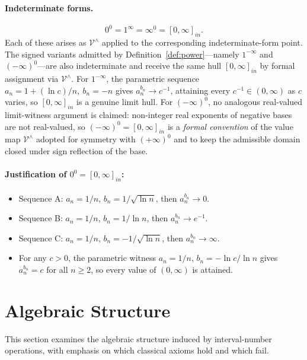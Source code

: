 \documentclass[11pt,a4paper]{article}
\theoremstyle{paperdef}
\newcommand{\inI}[1]{[#1]_{in}}
\newcommand{\Vhat}{\mathcal{V}^{\wedge}}
\begin{document}
\paragraph{Indeterminate forms.}
\[
0^{0} = 1^{\infty} = \infty^{0} = \inI{0, \infty}.
\]
Each of these arises as $\Vhat$ applied to the corresponding
indeterminate-form point. The signed variants admitted by
Definition~\ref{def:power}---namely $1^{-\infty}$ and
$(-\infty)^{0}$---are also indeterminate and receive the same hull
$\inI{0, \infty}$ by formal assignment via $\Vhat$. For
$1^{-\infty}$, the parametric sequence
$a_n = 1 + (\ln c)/n,\ b_n = -n$ gives $a_n^{b_n} \to c^{-1}$,
attaining every $c^{-1} \in (0, \infty)$ as $c$ varies, so
$\inI{0, \infty}$ is a genuine limit hull. For $(-\infty)^{0}$, no
analogous real-valued limit-witness argument is claimed: non-integer
real exponents of negative bases are not real-valued, so
$(-\infty)^{0} = \inI{0, \infty}$ is a \emph{formal convention} of
the value map $\Vhat$ adopted for symmetry with $(+\infty)^{0}$ and
to keep the admissible domain closed under sign reflection of the
base.

\paragraph{Justification of $0^{0} = \inI{0, \infty}$:}
\begin{itemize}[leftmargin=2em]
  \item Sequence A: $a_n = 1/n$, $b_n = 1/\sqrt{\ln n}$, then
    $a_n^{b_n} \to 0$.
  \item Sequence B: $a_n = 1/n$, $b_n = 1/\ln n$, then
    $a_n^{b_n} \to e^{-1}$.
  \item Sequence C: $a_n = 1/n$, $b_n = -1/\sqrt{\ln n}$, then
    $a_n^{b_n} \to \infty$.
  \item For any $c > 0$, the parametric witness $a_n = 1/n$,
    $b_n = -\ln c / \ln n$ gives $a_n^{b_n} = c$ for all $n \ge 2$,
    so every value of $(0, \infty)$ is attained.
\end{itemize}

\section{Algebraic Structure}\label{sec:algebraic-structure}

This section examines the algebraic structure induced by
interval-number operations, with emphasis on which classical axioms
hold and which fail.
\end{document}
